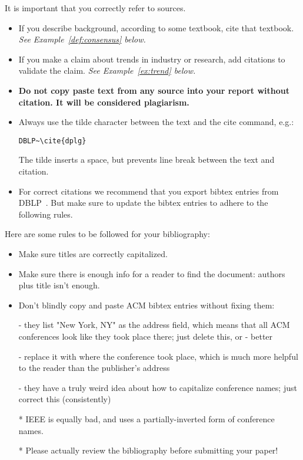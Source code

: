 It is important that you correctly refer to sources. 

\begin{itemize}
\item If you describe background, according to some textbook, cite that textbook. \emph{See Example~\ref{def:consensus} below.}
\item If you make a claim about trends in industry or research, add citations to validate the claim. \emph{See Example~\ref{ex:trend} below.}
\item \textbf{Do not copy paste text from any source into your report without citation. It will be considered plagiarism.}
\item Always use the tilde character between the text and the cite command, e.g.:\begin{verbatim}
DBLP~\cite{dplg}
\end{verbatim}
The tilde inserts a space, but prevents line break between the text and citation.
\item For correct citations we recommend that you export bibtex entries from DBLP~\cite{dplg}. 
But make sure to update the bibtex entries to adhere to the following rules.
\end{itemize}

Here are some rules to be followed for your bibliography:

\begin{itemize}
\item Make sure titles are correctly capitalized.


\item Make sure there is enough info for a reader to find the document: authors
plus title isn't enough.

\item Don't blindly copy and paste ACM bibtex entries without fixing them:

- they list "New York, NY" as the address field, which means that all ACM
conferences look like they took place there; just delete this, or - better

- replace it with where the conference took place, which is much more
helpful to the reader than the publisher's address

- they have a truly weird idea about how to capitalize conference names;
just correct this (consistently)

* IEEE is equally bad, and uses a partially-inverted form of conference
names.

* Please actually review the bibliography before submitting your paper!
\end{itemize}

